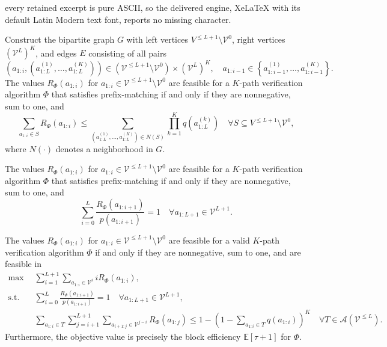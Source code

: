 \documentclass[10pt,a4paper]{amsart}
\newcommand{\V}{\mathcal{V}}
\begin{document}
every retained excerpt is pure ASCII, so the delivered engine, XeLaTeX with its default Latin Modern text font, reports no missing character.
\begin{lemma}
    Construct the bipartite graph $G$ with left vertices $V^{\leq L+1} \setminus \V^0$, right vertices $(\V^L)^K$, and edges $E$ consisting of all pairs \begin{equation}
        \left(a_{1:i},\left(a^{(1)}_{1:L},\ldots,a^{(K)}_{1:L}\right)\right) \in \left(\V^{\leq L+1}\setminus \V^0\right) \times \left(\V^L\right)^K, \quad a_{1:i-1} \in \left\{a^{(1)}_{1:i-1},\ldots,a^{(K)}_{1:i-1}\right\}.
    \end{equation} The values $R_\Phi(a_{1:i})$ for $a_{1:i} \in \V^{\leq L+1}\setminus \V^0$ are feasible for a $K$-path verification algorithm $\Phi$ that satisfies prefix-matching if and only if they are nonnegative, sum to one, and 
    \begin{equation}
        \sum_{a_{1:i} \in S} R_\Phi(a_{1:i}) \leq \sum_{\left(a^{(1)}_{1:L},\ldots,a^{(K)}_{1:L}\right) \in N(S)}  \prod_{k=1}^K q\left(a^{(k)}_{1:L}\right) \quad \forall S \subseteq V^{\leq L+1} \setminus \V^0,
    \end{equation}
    where $N(\cdot)$ denotes a neighborhood in $G$.
    \label{lem:prefix}
\end{lemma}

\begin{lemma}
    The values $R_\Phi(a_{1:i})$ for $a_{1:i} \in \V^{\leq L+1}\setminus \V^0$ are feasible for a $K$-path verification algorithm $\Phi$ that satisfies prefix-matching if and only if they are nonnegative, sum to one, and
    \begin{equation}
        \sum_{i=0}^{L} \frac{R_\Phi(a_{1:i+1})}{p(a_{1:i+1})} = 1\quad \forall a_{1:L+1} \in \V^{L+1}.
    \end{equation}
    \label{lem:target}
\end{lemma}

\begin{lemma}
    The values $R_\Phi(a_{1:i})$ for $a_{1:i} \in \V^{\leq L+1}\setminus \V^0$ are feasible for a valid $K$-path verification algorithm $\Phi$ if and only if they are nonnegative, sum to one, and are feasible in
    \begin{align}
        \max & \sum_{i=1}^{L+1} \sum_{a_{1:i} \in \V^{i}} i R_\Phi(a_{1:i}),\\
        \text{s.t.}\quad & \sum_{i=0}^{L} \frac{R_\Phi(a_{1:i+1})}{p(a_{1:i+1})} = 1\quad \forall a_{1:L+1} \in \V^{L+1},\\
        & \sum_{a_{1:i} \in T} \sum_{j=i+1}^{L+1} \sum_{a_{i+1:j} \in \V^{j-i}} R_\Phi(a_{1:j})  \leq 1 - \left(1 - \sum_{a_{1:i} \in T} q(a_{1:i})\right)^K \quad \forall T \in \mathcal{A}(\V^{\leq L}).
    \end{align}
    Furthermore, the objective value is precisely the block efficiency $\mathbb{E}[\tau+1]$ for $\Phi$.
\end{lemma}
\end{document}
